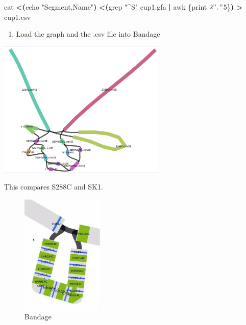 \documentclass[
]{book}
\newenvironment{Shaded}{\begin{snugshade}}{\end{snugshade}}
\newcommand{\BuiltInTok}[1]{#1}
\newcommand{\FunctionTok}[1]{\textcolor[rgb]{0.00,0.00,0.00}{#1}}
\newcommand{\KeywordTok}[1]{\textcolor[rgb]{0.13,0.29,0.53}{\textbf{#1}}}
\newcommand{\NormalTok}[1]{#1}
\newcommand{\OperatorTok}[1]{\textcolor[rgb]{0.81,0.36,0.00}{\textbf{#1}}}
\newcommand{\StringTok}[1]{\textcolor[rgb]{0.31,0.60,0.02}{#1}}
\providecommand{\tightlist}{%
  \setlength{\itemsep}{0pt}\setlength{\parskip}{0pt}}
\begin{document}
\begin{Shaded}
\begin{Highlighting}[]
 \FunctionTok{cat} \OperatorTok{\textless{}(}\BuiltInTok{echo} \StringTok{"Segment,Name"}\OperatorTok{)} \OperatorTok{\textless{}(}\FunctionTok{grep} \StringTok{"\^{}S"}\NormalTok{ cup1.gfa }\KeywordTok{|} \FunctionTok{awk} \StringTok{\textquotesingle{}\{print $2 "," $5\}\textquotesingle{}}\OperatorTok{)} \OperatorTok{\textgreater{}}\NormalTok{ cup1.csv}
\end{Highlighting}
\end{Shaded}

\begin{enumerate}
\def\labelenumi{\arabic{enumi}.}
\setcounter{enumi}{2}
\tightlist
\item
  Load the graph and the .csv file into Bandage
\end{enumerate}

\includegraphics[width=0.6\textwidth,height=\textheight]{./Figures/Bandage3.png}

This compares S288C and SK1.

\begin{figure}
\centering
\includegraphics[width=0.35\textwidth,height=\textheight]{./Figures/Bandage4.png}
\caption{Bandage}
\end{figure}
\end{document}
